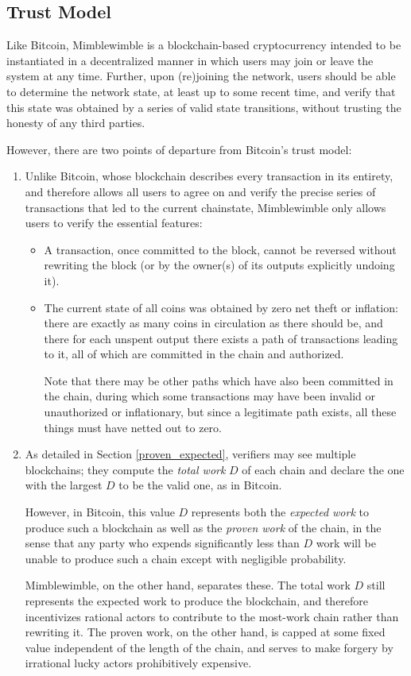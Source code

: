 \documentclass[letterpaper]{article}
\begin{document}
\subsection{Trust Model\label{sec:trust}}

Like Bitcoin, Mimblewimble is a blockchain-based cryptocurrency intended
to be instantiated in a decentralized manner in which users may join or
leave the system at any time. Further, upon (re)joining the network, users
should be able to determine the network state, at least up to some recent
time, and verify that this state was obtained by a series of valid state
transitions, without trusting the honesty of any third parties.

However, there are two points of departure from Bitcoin's trust model:
\begin{enumerate}
\item Unlike Bitcoin, whose blockchain describes every transaction in its
entirety, and therefore allows all users to agree on and verify the precise
series of transactions that led to the current chainstate, Mimblewimble
only allows users to verify the essential features:
\begin{itemize}
\item A transaction, once committed to the block, cannot be reversed
without rewriting the block (or by the owner(s) of its outputs explicitly
undoing it).
\item The current state of all coins was obtained by zero net theft or
inflation: there are exactly as many coins in circulation as there should
be, and there for each unspent output there exists a path of transactions
leading to it, all of which are committed in the chain and authorized.

Note that there may be other paths which have also been committed in the
chain, during which some transactions may have been invalid or unauthorized
or inflationary, but since a legitimate path exists, all these things must
have netted out to zero.
\end{itemize}

\item As detailed in Section \ref{proven_expected}, verifiers may see
multiple blockchains; they compute the \emph{total work} $D$ of each
chain and declare the one with the largest $D$ to be the valid one, as
in Bitcoin.

However, in Bitcoin, this value $D$ represents both the \emph{expected work}
to produce such a blockchain as well as the \emph{proven work} of the chain,
in the sense that any party who expends significantly less than $D$ work
will be unable to produce such a chain except with negligible probability.

Mimblewimble, on the other hand, separates these. The total work $D$ still
represents the expected work to produce the blockchain, and therefore
incentivizes rational actors to contribute to the most-work chain rather
than rewriting it. The proven work, on the other hand, is capped at some
fixed value independent of the length of the chain, and serves to make
forgery by irrational lucky actors prohibitively expensive.
\end{enumerate}
\end{document}
